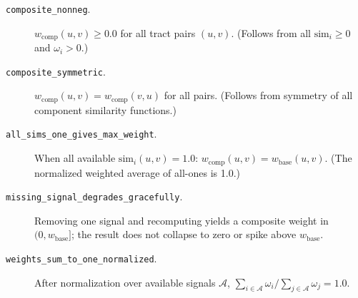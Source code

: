 \begin{description}
  \item[\texttt{composite\_nonneg}.]
    $w_{\mathrm{comp}}(u, v) \geq 0.0$ for all tract pairs $(u, v)$.
    (Follows from all $\mathrm{sim}_i \geq 0$ and $\omega_i > 0$.)
  \item[\texttt{composite\_symmetric}.]
    $w_{\mathrm{comp}}(u, v) = w_{\mathrm{comp}}(v, u)$ for all pairs.
    (Follows from symmetry of all component similarity functions.)
  \item[\texttt{all\_sims\_one\_gives\_max\_weight}.]
    When all available $\mathrm{sim}_i(u, v) = 1.0$:
    $w_{\mathrm{comp}}(u, v) = w_{\mathrm{base}}(u, v)$.
    (The normalized weighted average of all-ones is 1.0.)
  \item[\texttt{missing\_signal\_degrades\_gracefully}.]
    Removing one signal and recomputing yields a composite weight in
    $(0, w_{\mathrm{base}}]$; the result does not collapse to zero or
    spike above $w_{\mathrm{base}}$.
  \item[\texttt{weights\_sum\_to\_one\_normalized}.]
    After normalization over available signals $\mathcal{A}$,
    $\sum_{i \in \mathcal{A}} \omega_i / \sum_{j \in \mathcal{A}} \omega_j = 1.0$.
\end{description}
